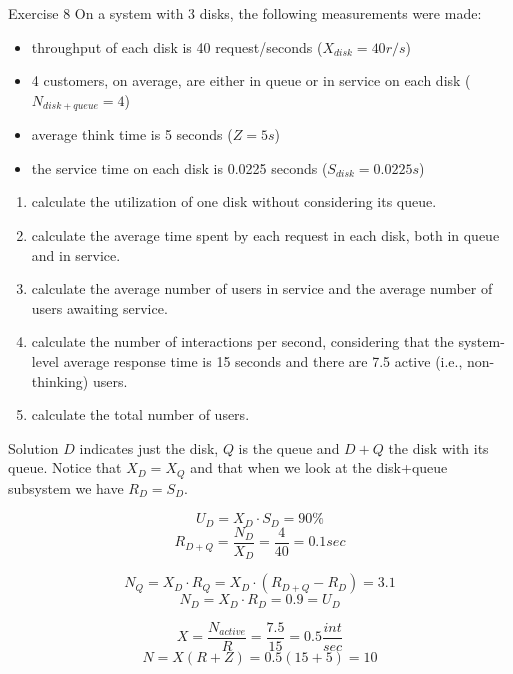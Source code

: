 \documentclass[]{beamer}
\begin{document}
\begin{frame}[allowframebreaks]{Exercise 8}
On a system with 3 disks, the following measurements were made:
\begin{itemize}
	\item throughput of each disk is 40 request/seconds ($X_{disk} = 40r/s$)
	\item 4 customers, on average, are either in queue or in service on each disk ($N_{disk+queue} = 4$)
	\item average think time is 5 seconds ($Z = 5s$)
	\item the service time on each disk is 0.0225 seconds ($S_{disk} = 0.0225s$)
\end{itemize}

\begin{enumerate}
	\item calculate the utilization of one disk without considering its queue.
	\item calculate the average time spent by each request in each disk, both in queue and
	in service.
	\item calculate the average number of users in service and the average number of users
	awaiting service.
	\item calculate the number of interactions per second, considering that the system-level
	average response time is 15 seconds and there are 7.5 active (i.e., non-thinking)
	users.
	\item calculate the total number of users.
\end{enumerate}
\end{frame}

\begin{frame}{Solution}
$D$ indicates just the disk, $Q$ is the queue and $D+Q$ the disk with its queue. Notice that $X_D = X_Q$ and that when we look at the disk+queue subsystem we have $R_D=S_D$.

$$U_D = X_D \cdot S_D = 90\%$$
$$R_{D+Q} = \frac{N_D}{X_D} = \frac{4}{40} = 0.1 sec$$

$$N_Q = X_D \cdot R_Q = X_D \cdot (R_{D+Q} - R_D) = 3.1$$
$$N_D = X_D \cdot R_D = 0.9 = U_D$$

$$X = \frac{N_{active}}{R} = \frac{7.5}{15} = 0.5 \frac{int}{sec}$$
$$N = X(R+Z) = 0.5(15+5)=10$$
\end{frame}
\end{document}
